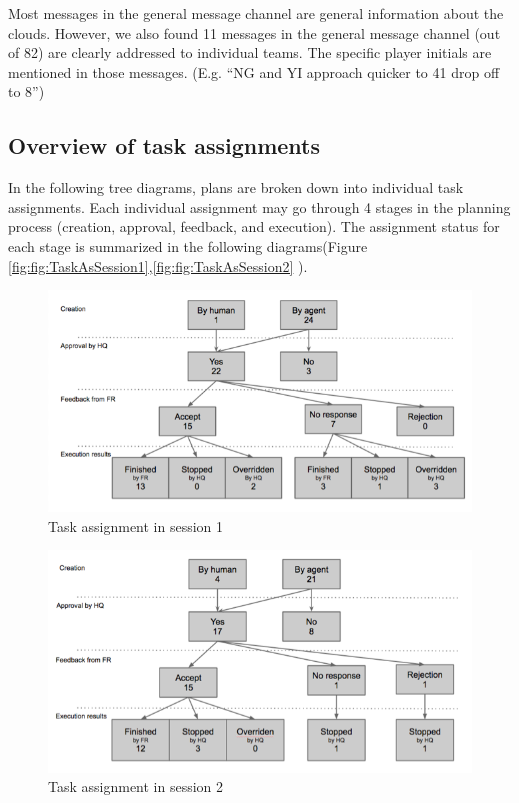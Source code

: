 Most messages in the general message channel are general information about the clouds. However, we also found 11 messages in the general message channel (out of 82) are clearly addressed to individual teams. The specific player initials are mentioned in those messages. (E.g. ``NG and YI approach quicker to 41 drop off to 8'')\\

\subsection{Overview of task assignments}
In the following tree diagrams, plans are broken down into individual task assignments. Each individual assignment may go through 4 stages in the planning process (creation, approval, feedback, and execution). The assignment status for each stage is summarized in the following diagrams(Figure \ref{fig:fig:TaskAsSession1},\ref{fig:fig:TaskAsSession2} ). \\

\begin{figure}[ht]
 \includegraphics[width=1\textwidth]{img/study3/TaskAsSession1}
\caption{Task assignment in session 1}
\label{fig:TaskAsSession1}
\end{figure}

\begin{figure}[ht]
 \includegraphics[width=1\textwidth]{img/study3/TaskAsSession2}
\caption{Task assignment in session 2}
\label{fig:TaskAsSession2}
\end{figure}

